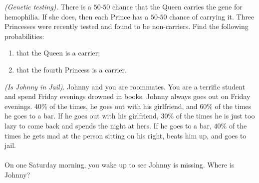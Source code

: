 \begin{problem}[Handout 5, \# 2]
  \emph{(Genetic testing).} There is a \(50\)-\(50\) chance that the Queen
  carries the gene for hemophilia. If she does, then each Prince has a
  \(50\)-\(50\) chance of carrying it. Three Princesses were recently
  tested and found to be non-carriers. Find the following probabilities:
  \begin{enumerate}[label=(\alph*),noitemsep]
  \item that the Queen is a carrier;
  \item that the fourth Princess is a carrier.
  \end{enumerate}
\end{problem}
\begin{solution}

\end{solution}
\newpage

\begin{problem}[Handout 5, \# 4]
  \emph{(Is Johnny in Jail).} Johnny and you are roommates. You are a
  terrific student and spend Friday evenings drowned in books. Johnny
  always goes out on Friday evenings. \(40\%\) of the times, he goes out
  with his girlfriend, and \(60\%\) of the times he goes to a bar. If he
  goes out with his girlfriend, \(30\%\) of the times he is just too lazy
  to come back and spends the night at hers. If he goes to a bar, \(40\%\)
  of the times he gets mad at the person sitting on his right, beats him
  up, and goes to jail.
  \\\\
  On one Saturday morning, you wake up to see Johnny is missing. Where is
  Johnny?
\end{problem}
\begin{solution}

\end{solution}

